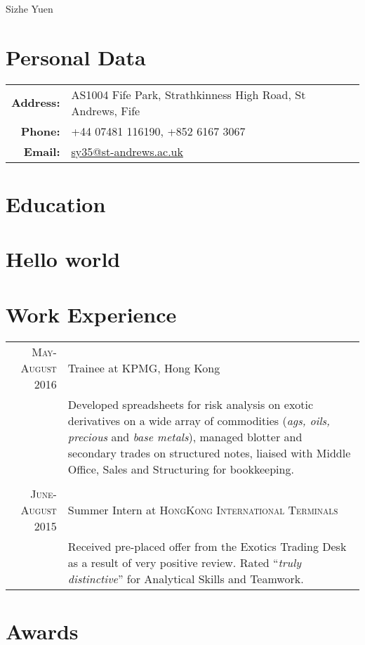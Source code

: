 \documentclass{article}
\begin{document}
\pagestyle{empty} %


\par{\centering
		{\Huge Sizhe Yuen
	}\bigskip\par}

\section*{Personal Data}

\begin{tabular}{rl}
    \textbf{Address:}   & AS1004 Fife Park, Strathkinness High Road, St Andrews, Fife \\
    \textbf{Phone:}     & +44 07481 116190, +852 6167 3067 \\
    \textbf{Email:}     & \textcolor{blue}{\href{mailto:sy35@st-andrews.ac.uk}{sy35@st-andrews.ac.uk}}
\end{tabular}

\section*{Education}

\section*{Hello world}

\section*{Work Experience}
\begin{tabular}{r|p{14cm}}

\textsc{May-August 2016} & Trainee at \textsc{KPMG}, Hong Kong \\
 
&\footnotesize{Developed spreadsheets for risk analysis on exotic derivatives on a wide array of commodities (\textit{ags, oils, precious} and \textit{base metals}), managed blotter and secondary trades on structured notes, liaised with Middle Office, Sales and Structuring for bookkeeping.}\\\multicolumn{2}{c}{} \\


\textsc{June-August 2015} & Summer Intern at \textsc{HongKong International Terminals} \\

&\footnotesize{Received pre-placed offer from the Exotics Trading Desk as a result of very positive review. Rated ``\emph{truly distinctive}'' for Analytical Skills and Teamwork.}
\end{tabular}


\section*{Awards}
\end{document}
